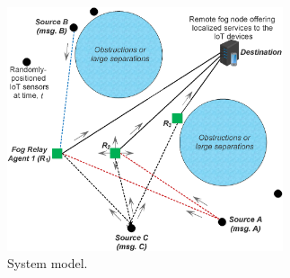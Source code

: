 \documentclass[journal]{IEEEtran}
\begin{document}
\begin{figure}[!t]
\centering
\includegraphics[width=3.2in]{ideafig1.eps}
\caption{System model.}
\label{ideafig1}
\end{figure}
\end{document}
